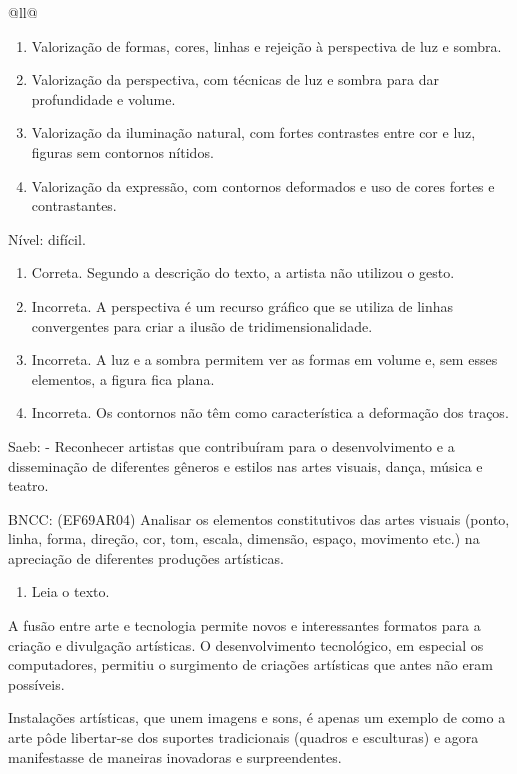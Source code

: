 \begin{itemize}
\begin{itemize}
\begin{escolha}[]{@{}ll@{}}
\begin{enumerate}
\def\labelenumi{\alph{enumi})}
\item
  Valorização de formas, cores, linhas e rejeição à perspectiva de luz e
  sombra.
\item
  Valorização da perspectiva, com técnicas de luz e sombra para dar
  profundidade e volume.
\item
  Valorização da iluminação natural, com fortes contrastes entre cor e
  luz, figuras sem contornos nítidos.
\item
  Valorização da expressão, com contornos deformados e uso de cores
  fortes e contrastantes.
\end{enumerate}

Nível: difícil.

\begin{enumerate}
\def\labelenumi{\alph{enumi})}
\item
  Correta. Segundo a descrição do texto, a artista não utilizou o gesto.
\item
  Incorreta. A perspectiva é um recurso gráfico que se utiliza de linhas
  convergentes para criar a ilusão de tridimensionalidade.
\item
  Incorreta. A luz e a sombra permitem ver as formas em volume e, sem
  esses elementos, a figura fica plana. ~
\item
  Incorreta. Os contornos não têm como característica a deformação dos
  traços.
\end{enumerate}

Saeb: - Reconhecer artistas que contribuíram para o desenvolvimento e a
disseminação de diferentes gêneros e estilos nas artes visuais, dança,
música e teatro.

BNCC: (EF69AR04) Analisar os elementos constitutivos das artes visuais
(ponto, linha, forma, direção, cor, tom, escala, dimensão, espaço,
movimento etc.) na apreciação de diferentes produções artísticas.

\begin{enumerate}
\def\labelenumi{\arabic{enumi}.}
\item
  Leia o texto.
\end{enumerate}

A fusão entre arte e tecnologia permite novos e interessantes formatos
para a criação e divulgação artísticas. O desenvolvimento tecnológico,
em especial os computadores, permitiu o surgimento de criações
artísticas que antes não eram possíveis.

Instalações artísticas, que unem imagens e sons, é apenas um exemplo de
como a arte pôde libertar-se dos suportes tradicionais (quadros e
esculturas) e agora manifestasse de maneiras inovadoras e
surpreendentes.


\end{escolha}
\end{itemize}
\end{itemize}
